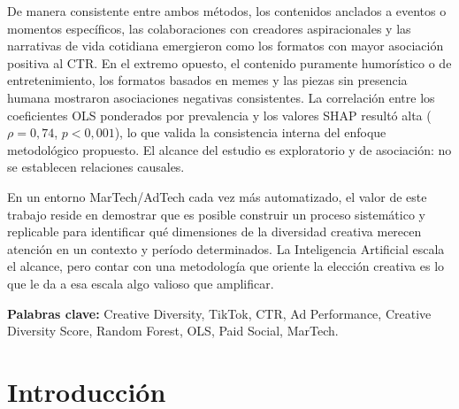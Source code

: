 \documentclass[12pt, a4paper]{report}
\begin{document}
De manera consistente entre ambos métodos, los contenidos anclados a eventos
o momentos específicos, las colaboraciones con creadores aspiracionales y las
narrativas de vida cotidiana emergieron como los formatos con mayor asociación
positiva al CTR. En el extremo opuesto, el contenido puramente humorístico o
de entretenimiento, los formatos basados en memes y las piezas sin presencia
humana mostraron asociaciones negativas consistentes. La correlación entre los
coeficientes OLS ponderados por prevalencia y los valores SHAP resultó alta
($\rho = 0{,}74$, $p < 0{,}001$), lo que valida la consistencia interna del
enfoque metodológico propuesto. El alcance del estudio es exploratorio y de
asociación: no se establecen relaciones causales.

En un entorno MarTech/AdTech cada vez más automatizado, el valor de este
trabajo reside en demostrar que es posible construir un proceso sistemático
y replicable para identificar qué dimensiones de la diversidad creativa
merecen atención en un contexto y período determinados. La Inteligencia
Artificial escala el alcance, pero contar con una metodología que oriente
la elección creativa es lo que le da a esa escala algo valioso que amplificar.

\bigskip
\textbf{Palabras clave:} Creative Diversity, TikTok, CTR, Ad Performance,
Creative Diversity Score, Random Forest, OLS, Paid Social, MarTech.\newpage

\tableofcontents
\newpage

\listoffigures
{}
\newpage

\listoftables
{}
\newpage

\pagestyle{fancy}
\setcounter{page}{1}

\chapter{Introducción}
\end{document}

